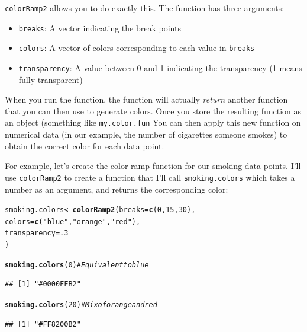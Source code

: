 \documentclass{tufte-book}\usepackage[]{graphicx}\usepackage[]{color}
\makeatletter
\newcommand{\hlnum}[1]{\textcolor[rgb]{0.686,0.059,0.569}{#1}}%
\newcommand{\hlstr}[1]{\textcolor[rgb]{0.192,0.494,0.8}{#1}}%
\newcommand{\hlcom}[1]{\textcolor[rgb]{0.678,0.584,0.686}{\textit{#1}}}%
\newcommand{\hlstd}[1]{\textcolor[rgb]{0.345,0.345,0.345}{#1}}%
\newcommand{\hlkwb}[1]{\textcolor[rgb]{0.69,0.353,0.396}{#1}}%
\newcommand{\hlkwc}[1]{\textcolor[rgb]{0.333,0.667,0.333}{#1}}%
\newcommand{\hlkwd}[1]{\textcolor[rgb]{0.737,0.353,0.396}{\textbf{#1}}}%
\newenvironment{kframe}{%
 \def\at@end@of@kframe{}%
 \ifinner\ifhmode%
  \def\at@end@of@kframe{\end{minipage}}%
  \begin{minipage}{\columnwidth}%
 \fi\fi%
 \def\FrameCommand##1{\hskip\@totalleftmargin \hskip-\fboxsep
 \colorbox{shadecolor}{##1}\hskip-\fboxsep
     \hskip-\linewidth \hskip-\@totalleftmargin \hskip\columnwidth}%
 \MakeFramed {\advance\hsize-\width
   \@totalleftmargin\z@ \linewidth\hsize
   \@setminipage}}%
 {\par\unskip\endMakeFramed%
 \at@end@of@kframe}
\newenvironment{knitrout}{}{} %
\makeatother
\begin{document}
\texttt{colorRamp2} allows you to do exactly this. The function has three arguments:

\begin{itemize}
  \item \texttt{breaks}: A vector indicating the break points
  \item \texttt{colors}: A vector of colors corresponding to each value in \texttt{breaks}
  \item \texttt{transparency}: A value between 0 and 1 indicating the transparency (1 means fully transparent)
\end{itemize}

When you run the function, the function will actually \textit{return} another function that you can then use to generate colors. Once you store the resulting function as an object (something like \texttt{my.color.fun} You can then apply this new function on numerical data (in our example, the number of cigarettes someone smokes) to obtain the correct color for each data point.

For example, let's create the color ramp function for our smoking data points. I'll use \texttt{colorRamp2} to create a function that I'll call \texttt{smoking.colors} which takes a number as an argument, and returns the corresponding color:

\begin{knitrout}
\color{fgcolor}\begin{kframe}
\begin{alltt}
\hlstd{smoking.colors} \hlkwb{<-} \hlkwd{colorRamp2}\hlstd{(}\hlkwc{breaks} \hlstd{=} \hlkwd{c}\hlstd{(}\hlnum{0}\hlstd{,} \hlnum{15}\hlstd{,} \hlnum{30}\hlstd{),}
                  \hlkwc{colors} \hlstd{=} \hlkwd{c}\hlstd{(}\hlstr{"blue"}\hlstd{,} \hlstr{"orange"}\hlstd{,} \hlstr{"red"}\hlstd{),}
                  \hlkwc{transparency} \hlstd{=} \hlnum{.3}
                  \hlstd{)}

\hlkwd{smoking.colors}\hlstd{(}\hlnum{0}\hlstd{)} \hlcom{# Equivalent to blue}
\end{alltt}
\begin{verbatim}
## [1] "#0000FFB2"
\end{verbatim}
\begin{alltt}
\hlkwd{smoking.colors}\hlstd{(}\hlnum{20}\hlstd{)} \hlcom{# Mix of orange and red}
\end{alltt}
\begin{verbatim}
## [1] "#FF8200B2"
\end{verbatim}
\end{kframe}
\end{knitrout}
\end{document}
